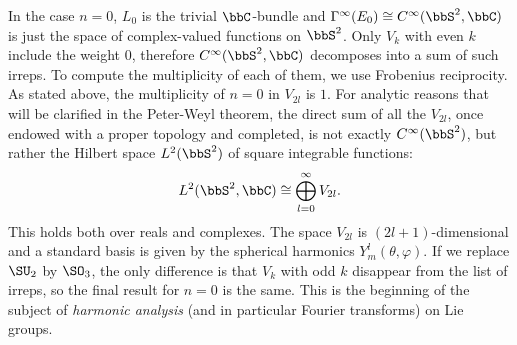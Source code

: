 \begin{example}
    In the case $n=0$, $L_0$ is the trivial $\bbC$-bundle and $\Gamma^\infty(E_0)\cong C^\infty(\bbS^2,\bbC)$ is just the space of complex-valued functions on $\bbS^2$. Only $V_k$ with even $k$ include the weight $0$, therefore $C^\infty(\bbS^2,\bbC)$ decomposes into a sum of such irreps. To compute the multiplicity of each of them, we use Frobenius reciprocity. As stated above, the multiplicity of $n=0$ in $V_{2l}$ is $1$. For analytic reasons that will be clarified in the Peter-Weyl theorem, the direct sum of all the $V_{2l}$, once endowed with a proper topology and completed, is not exactly $C^\infty(\bbS^2)$, but rather the Hilbert space $L^2(\bbS^2)$ of square integrable functions:
    \[L^2(\bbS^2,\bbC)\cong \bigoplus_{l=0}^\infty V_{2l}.\]
    This holds both over reals and complexes. The space $V_{2l}$ is $(2l+1)$-dimensional and a standard basis is given by the spherical harmonics $Y^l_m(\theta,\varphi)$. If we replace $\SU_2$ by $\SO_3$, the only difference is that $V_k$ with odd $k$ disappear from the list of irreps, so the final result for $n=0$ is the same. This is the beginning of the subject of \emph{harmonic analysis} (and in particular Fourier transforms) on Lie groups.
\end{example}








